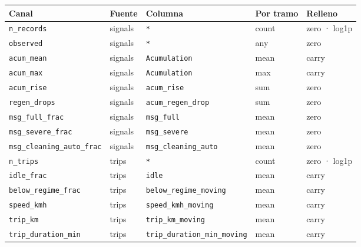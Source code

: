 \begin{tabular}{@{}lllll@{}}
\toprule
Canal & Fuente & Columna & Por tramo & Relleno \\
\midrule
\texttt{n\_records} & signals & \texttt{*} & count & zero · log1p \\
\texttt{observed} & signals & \texttt{*} & any & zero \\
\texttt{acum\_mean} & signals & \texttt{Acumulation} & mean & carry \\
\texttt{acum\_max} & signals & \texttt{Acumulation} & max & carry \\
\texttt{acum\_rise} & signals & \texttt{acum\_rise} & sum & zero \\
\texttt{regen\_drops} & signals & \texttt{acum\_regen\_drop} & sum & zero \\
\texttt{msg\_full\_frac} & signals & \texttt{msg\_full} & mean & zero \\
\texttt{msg\_severe\_frac} & signals & \texttt{msg\_severe} & mean & zero \\
\texttt{msg\_cleaning\_auto\_frac} & signals & \texttt{msg\_cleaning\_auto} & mean & zero \\
\texttt{n\_trips} & trips & \texttt{*} & count & zero · log1p \\
\texttt{idle\_frac} & trips & \texttt{idle} & mean & carry \\
\texttt{below\_regime\_frac} & trips & \texttt{below\_regime\_moving} & mean & carry \\
\texttt{speed\_kmh} & trips & \texttt{speed\_kmh\_moving} & mean & carry \\
\texttt{trip\_km} & trips & \texttt{trip\_km\_moving} & mean & carry \\
\texttt{trip\_duration\_min} & trips & \texttt{trip\_duration\_min\_moving} & mean & carry \\
\bottomrule
\end{tabular}
